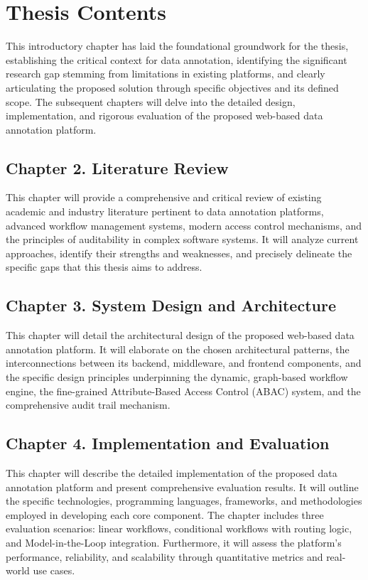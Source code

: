 \label{chap1:sec4-thesis-content}

\section{Thesis Contents}
This introductory chapter has laid the foundational groundwork for the thesis, establishing the critical context for data annotation, identifying the significant research gap stemming from limitations in existing platforms, and clearly articulating the proposed solution through specific objectives and its defined scope. The subsequent chapters will delve into the detailed design, implementation, and rigorous evaluation of the proposed web-based data annotation platform.

\subsection*{Chapter 2. Literature Review}
  This chapter will provide a comprehensive and critical review of existing academic and industry literature pertinent to data annotation platforms, advanced workflow management systems, modern access control mechanisms, and the principles of auditability in complex software systems. It will analyze current approaches, identify their strengths and weaknesses, and precisely delineate the specific gaps that this thesis aims to address.

\subsection*{Chapter 3. System Design and Architecture}
 This chapter will detail the architectural design of the proposed web-based data annotation platform. It will elaborate on the chosen architectural patterns, the interconnections between its backend, middleware, and frontend components, and the specific design principles underpinning the dynamic, graph-based workflow engine, the fine-grained Attribute-Based Access Control (ABAC) system, and the comprehensive audit trail mechanism.

\subsection*{Chapter 4. Implementation and Evaluation}
 This chapter will describe the detailed implementation of the proposed data annotation platform and present comprehensive evaluation results. It will outline the specific technologies, programming languages, frameworks, and methodologies employed in developing each core component. The chapter includes three evaluation scenarios: linear workflows, conditional workflows with routing logic, and Model-in-the-Loop integration. Furthermore, it will assess the platform's performance, reliability, and scalability through quantitative metrics and real-world use cases.


